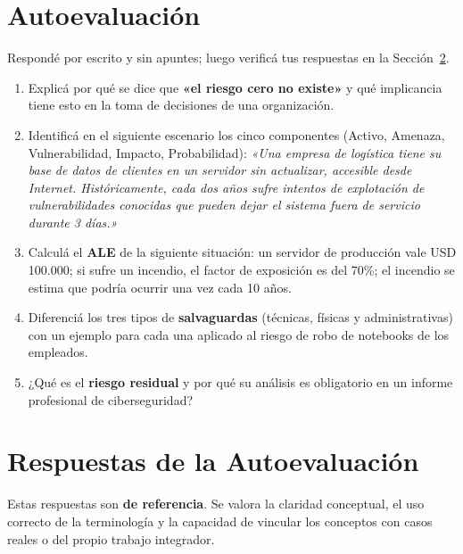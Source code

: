 \documentclass[11pt,a4paper]{article}
\begin{document}
\section{Autoevaluación}\label{sec:autoeval}
Respondé por escrito y sin apuntes; luego verificá tus respuestas en la Sección~\ref{sec:respuestas}.

\begin{enumerate}[leftmargin=*]
  \item Explicá por qué se dice que \textbf{«el riesgo cero no existe»} y qué implicancia tiene esto en la toma de decisiones de una organización.
  \item Identificá en el siguiente escenario los cinco componentes (Activo, Amenaza, Vulnerabilidad, Impacto, Probabilidad): \textit{«Una empresa de logística tiene su base de datos de clientes en un servidor sin actualizar, accesible desde Internet. Históricamente, cada dos años sufre intentos de explotación de vulnerabilidades conocidas que pueden dejar el sistema fuera de servicio durante 3 días.»}
  \item Calculá el \textbf{ALE} de la siguiente situación: un servidor de producción vale USD 100.000; si sufre un incendio, el factor de exposición es del 70\%; el incendio se estima que podría ocurrir una vez cada 10 años.
  \item Diferenciá los tres tipos de \textbf{salvaguardas} (técnicas, físicas y administrativas) con un ejemplo para cada una aplicado al riesgo de robo de notebooks de los empleados.
  \item ¿Qué es el \textbf{riesgo residual} y por qué su análisis es obligatorio en un informe profesional de ciberseguridad?
\end{enumerate}

\section{Respuestas de la Autoevaluación}\label{sec:respuestas}

\begin{clave}
Estas respuestas son \textbf{de referencia}. Se valora la claridad conceptual, el uso correcto de la terminología y la capacidad de vincular los conceptos con casos reales o del propio trabajo integrador.
\end{clave}
\end{document}
